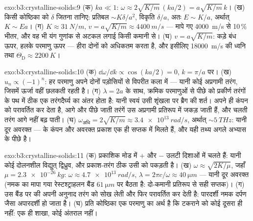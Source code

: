 \begin{solution}{exo:b3:crystalline-solids:9}
(क) $ka \ll 1$: $\omega \approx 2\sqrt{K/m}\,(ka/2) =
a\sqrt{K/m}\,k$। (ख) किसी कोष्ठिका को $\delta$ जितना तानिए: प्रतिबल
$\sim
K\delta/a^2$, विकृति $\delta/a$, अतः $E \sim K/a$, अर्थात् $K \sim
Ea$। (ग) $K \approx \qty{31}{N/m}$, $v = a\sqrt{K/m} \approx
\qty{4400}{m/s}$ --- मापे गए \qty{4000}{m/s} से 10\,\% भीतर, और वह
भी यंग गुणांक से अटकल लगाई किसी कमानी से। (घ) $v = a\sqrt{K/m}$:
कड़े बंध ऊपर, हलके परमाणु ऊपर --- हीरा दोनों को अधिकतम करता है, और
इसीलिए \qty{18000}{m/s} की ध्वनि तथा $\Theta_{\text{D}} \approx
\qty{2200}{K}$।
\end{solution}

\begin{solution}{exo:b3:crystalline-solids:10}
(क) $\dd\omega/\dd k \propto \cos(ka/2) = 0$, $k = \pi/a$ पर। (ख)
$u_n \propto (-1)^n$: हर परमाणु अपने दोनों पड़ोसियों से विपरीत कला
में --- यानी कोई अप्रगामी तरंग, जिसमें ऊर्जा वहीं छलकती रहती है। (ग)
$\lambda = 2a$ के साथ, क्रमिक परमाणुओं से पीछे को प्रकीर्ण तरंगों के
पथ में ठीक एक तरंगदैर्घ्य का अंतर होता है: यानी स्वयं उसी शृंखला पर
ब्रैग की शर्त।  अपने ही कंपन को परावर्तित कर देता है,
आगे और पीछे जाती तरंगें उस अप्रगामी प्रतिरूप में जकड़ जाती हैं, और
चलती तरंग आगे नहीं बढ़ पाती। (घ) $\omega_{\text{अधि}} = 2\sqrt{K/m} \approx
\qty{3.4e13}{rad/s}$, अर्थात् $\sim\qty{5}{THz}$: यानी दूर अवरक्त
---  के कंपन और अवरक्त प्रकाश एक ही सप्तक में मिलते हैं, और यही
तथ्य अगले अभ्यास के पीछे है।
\end{solution}

\begin{solution}{exo:b3:crystalline-solids:11}
(क) प्रकाशिक मोड में $+$ और $-$  उलटी दिशाओं में चलते हैं:
यानी कोई दोलनशील विद्युत् द्विध्रुव, और प्रकाश-तरंग ठीक उसी को पकड़ती
है। (ख) $\omega \approx \sqrt{2K/\mu}$, जहाँ $\mu =
\qty{2.3e-26}{kg}$:
$\omega \approx \qty{4.7e13}{rad/s}$,
$\lambda = 2\pi c/\omega \approx \qty{40}{\micro m}$ --- यानी दूर
अवरक्त (नमक का मापा गया रेस्टश्ट्राहलन बैंड
$\qty{61}{\micro m}$ पर बैठता है: दो-कमानी प्रतिरूप से सही सप्तक)। (ग)
उस बैंड पर  की अपनी अनुनाद तरंग को सोख लेती और फिर
परावर्तित कर देती है: पारदर्शी नमक दर्पण जैसा अपारदर्शी हो जाता है।
(घ) प्रति कोष्ठिका एक परमाणु का अर्थ है कि टकराने को कोई दूसरा
 ही नहीं: एक ही शाखा, कोई अंतराल नहीं।
\end{solution}

